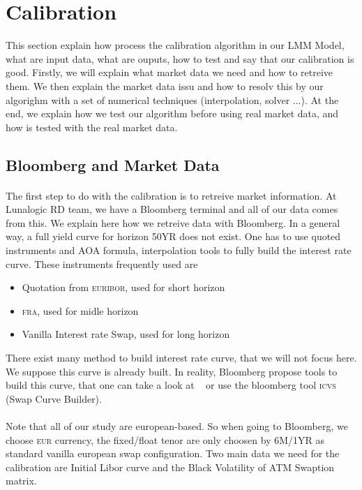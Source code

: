 \documentclass[a4paper,10pt]{article}
\newcommand{\bl}[1]{{\scshape  #1}}
\begin{document}
\section{Calibration}
This section explain how process the calibration algorithm in our LMM Model, what are input data, what are ouputs, how to test and say that our calibration is good. Firstly, we will explain what market data we need and how to retreive them. We then explain the market data issu and how to resolv this by our algorighm with a set of numerical techniques (interpolation, solver ...). At the end, we explain how we test our algorithm before using real market data, and how is tested with the real market data.   
\subsection{Bloomberg and Market Data}
\paragraph{} The first step to do with the calibration is to retreive market information. At Lunalogic RD team, we have a Bloomberg terminal and all of our data comes from this. We explain here how we retreive data with Bloomberg. In a general way, a full yield curve for horizon 50YR does not exist. One has to use quoted instruments and AOA formula, interpolation tools to fully build the interest rate curve. These instruments frequently used are
\begin{itemize}
 \item Quotation from \bl{euribor}, used for short horizon
 \item \bl{fra}, used for midle horizon
 \item Vanilla Interest rate Swap, used for long horizon
\end{itemize}
There exist many method to build interest rate curve, that we will not focus here. We suppose this curve is already built. In reality, Bloomberg propose tools to build this curve, that one can take a look at ~\cite{BL2012} or use the bloomberg tool \bl{icvs} (Swap Curve Builder).
\paragraph{} Note that all of our study are european-based. So when going to Bloomberg, we choose \bl{eur} currency, the fixed/float tenor are only choosen by 6M/1YR as standard vanilla european swap configuration. Two main data we need for the calibration are Initial Libor curve and the Black Volatility of ATM Swaption matrix.   
\end{document}
